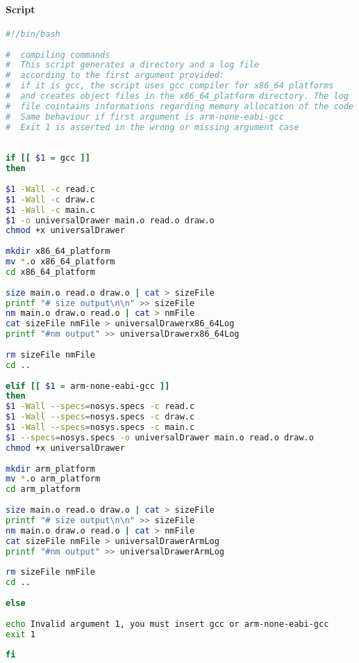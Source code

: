 \documentclass{article}
\begin{document}
		\paragraph{Script}
		\begin{center}
		\begin{lstlisting}[language=bash, basicstyle=\small]
#!/bin/bash
	
#  compiling commands
#  This script generates a directory and a log file
#  according to the first argument provided:
#  if it is gcc, the script uses gcc compiler for x86_64 platforms
#  and creates object files in the x86_64_platform directory. The log
#  file cointains informations regarding memory allocation of the code
#  Same behaviour if first argument is arm-none-eabi-gcc
#  Exit 1 is asserted in the wrong or missing argument case
		
		
if [[ $1 = gcc ]]
then
	
$1 -Wall -c read.c 
$1 -Wall -c draw.c 
$1 -Wall -c main.c
$1 -o universalDrawer main.o read.o draw.o
chmod +x universalDrawer
		
mkdir x86_64_platform
mv *.o x86_64_platform
cd x86_64_platform
		
size main.o read.o draw.o | cat > sizeFile 
printf "# size output\n\n" >> sizeFile
nm main.o draw.o read.o | cat > nmFile
cat sizeFile nmFile > universalDrawerx86_64Log
printf "#nm output" >> universalDrawerx86_64Log
	
rm sizeFile nmFile
cd ..
		
elif [[ $1 = arm-none-eabi-gcc ]]
then
$1 -Wall --specs=nosys.specs -c read.c 
$1 -Wall --specs=nosys.specs -c draw.c 
$1 -Wall --specs=nosys.specs -c main.c
$1 --specs=nosys.specs -o universalDrawer main.o read.o draw.o
chmod +x universalDrawer
		
mkdir arm_platform
mv *.o arm_platform
cd arm_platform
	
size main.o read.o draw.o | cat > sizeFile 
printf "# size output\n\n" >> sizeFile
nm main.o draw.o read.o | cat > nmFile
cat sizeFile nmFile > universalDrawerArmLog
printf "#nm output" >> universalDrawerArmLog
		
rm sizeFile nmFile
cd ..
		
else
		
echo Invalid argument 1, you must insert gcc or arm-none-eabi-gcc
exit 1
		
fi
		\end{lstlisting}
		\end{center}
\end{document}
